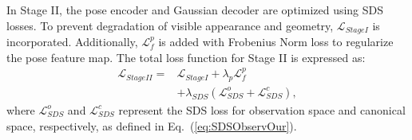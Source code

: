 

In Stage II, the pose encoder and Gaussian decoder are optimized using SDS losses. To prevent degradation of visible appearance and geometry, $\mathcal{L}_{StageI}$ is incorporated. Additionally, $\mathcal{L}_{f}^{p}$ is added with Frobenius Norm loss to regularize the pose feature map. The total loss function for Stage II is expressed as:
\begin{equation}
\begin{aligned}
\mathcal{L}_{StageII}=&\mathcal{L}_{StageI}+\lambda_{p}\mathcal{L}_{f}^{p}\\
&+\lambda_{SDS}(\mathcal{L}_{SDS}^{o}+\mathcal{L}_{SDS}^{c}),
\end{aligned}
  \label{eq:lossstage2}
\end{equation}
where $\mathcal{L}_{SDS}^{o}$ and $\mathcal{L}_{SDS}^{c}$ represent the SDS loss for observation space and canonical space, respectively, as defined in Eq.~(\ref{eq:SDSObservOur}). 

